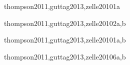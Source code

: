 \begin{syllabus}
\begin{unit}{\PLDeclarationsAndTypesDef}{}{thompson2011,guttag2013,zelle2010}{1}{a}
    \begin{topics}%
	\item \PLDeclarationsAndTypesTopicThe%
	\item \PLDeclarationsAndTypesTopicOverview%
    \end{topics}%
    \PLDeclarationsAndTypesAllObjectives
\end{unit}

\begin{unit}{\PFFundamentalConstructsDef}{}{thompson2011,guttag2013,zelle2010}{2}{a,b}
  \PFFundamentalConstructsAllTopics
  \PFFundamentalConstructsAllObjectives
\end{unit}

\begin{unit}{\PLFunctionalProgrammingDef}{}{thompson2011,guttag2013,zelle2010}{1}{a,b}
    \begin{topics}%
	\item \PLFunctionalProgrammingTopicOverview%
	\item \PLFunctionalProgrammingTopicRecursion%
	\item \PLFunctionalProgrammingTopicPragmatics%
    \end{topics}%
   \PLFunctionalProgrammingAllObjectives
\end{unit}

\begin{unit}{\PFRecursionDef}{}{thompson2011,guttag2013,zelle2010}{6}{a,b}
    \begin{topics}%
	\item \PFRecursionTopicTheconcept%
	\item \PFRecursionTopicRecursive%
	\item \PFRecursionTopicSimple%
	\item \PFRecursionTopicDiveAndConquer%
    \end{topics}%

    \begin{learningoutcomes}%
	\item \PFRecursionObjONE%
	\item \PFRecursionObjTWO%
	\item \PFRecursionObjTHREE%
	\item \PFRecursionObjFOUR%
	\item \PFRecursionObjFIVE%
	\item \PFRecursionObjSIX%
	\item \PFRecursionObjEIGHT%
    \end{learningoutcomes}%
\end{unit}


\end{syllabus}
